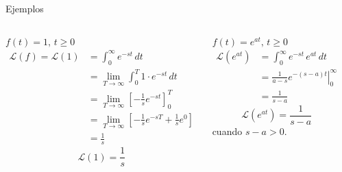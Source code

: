 \documentclass[9pt, aspectratio=169]{beamer}
\begin{document}
\begin{frame}{Ejemplos}
	\begin{columns}[t]
		\cx
		$f(t) = 1, \, t \geq 0$
		\begin{align*}
			\mathscr{L}(f) = \mathscr{L}(1) & = \int_0^{\infty} e^{-st} \, dt                                                      \\
			                                & = \lim_{T \rightarrow \infty} \int_0^T 1 \cdot e^{-s t} \, dt                        \\
			                                & = \lim_{T \rightarrow \infty} \left[ -\frac{1}{s} e^{-s t} \right]_0^T               \\
			                                & = \lim_{T \rightarrow \infty} \left[ -\frac{1}{s} e^{-s T} + \frac{1}{s} e^0 \right] \\
			                                & = \frac{1}{s}
		\end{align*}
		\[ \boxed{ \mathscr{L}(1) = \frac{1}{s} } \]
		\pause

		\cx
		$f(t) = e^{at}, \, t \geq 0$
		\begin{align*}
			\mathscr{L} (e^{at}) & = \int_0^{\infty} e^{-st} \, e^{at} \, dt               \\
			                     & = \left. \frac{1}{a - s} e^{-(s-a)t} \right|_0^{\infty} \\
			                     & = \frac{1}{s -a}
		\end{align*}
		\[ \boxed{ \mathscr{L}(e^{at}) = \frac{1}{s -a}} \]
		cuando $s -a > 0$.
	\end{columns}
\end{frame}
\end{document}
